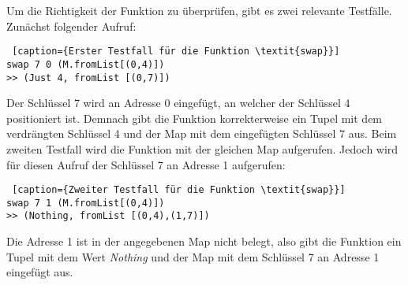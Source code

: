 Um die Richtigkeit der Funktion zu überprüfen, gibt es zwei relevante Testfälle. 
\newpage
Zunächst folgender Aufruf:
\begin{lstlisting} [caption={Erster Testfall für die Funktion \textit{swap}}]
swap 7 0 (M.fromList[(0,4)])
>> (Just 4, fromList [(0,7)])
\end{lstlisting}
Der Schlüssel 7 wird an Adresse 0 eingefügt, an welcher der Schlüssel 4 positioniert ist. Demnach gibt die Funktion korrekterweise ein Tupel mit dem verdrängten Schlüssel 4 und der Map mit dem eingefügten Schlüssel 7 aus. Beim zweiten Testfall wird die Funktion mit der gleichen Map aufgerufen. Jedoch wird für diesen Aufruf der Schlüssel 7 an Adresse 1 aufgerufen:
\begin{lstlisting} [caption={Zweiter Testfall für die Funktion \textit{swap}}]
swap 7 1 (M.fromList[(0,4)])
>> (Nothing, fromList [(0,4),(1,7)])
\end{lstlisting}
Die Adresse 1 ist in der angegebenen Map nicht belegt, also gibt die Funktion ein Tupel mit dem Wert \textit{Nothing} und der Map mit dem Schlüssel 7 an Adresse 1 eingefügt aus. 

